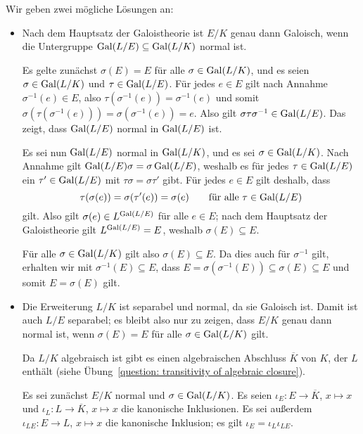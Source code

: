 \begin{solution}
  Wir geben zwei mögliche Lösungen an:
  \begin{itemize}
    \item
      Nach dem Hauptsatz der Galoistheorie ist $E/K$ genau dann Galoisch, wenn die Untergruppe $\operatorname{Gal}(L/E) \subseteq \operatorname{Gal}(L/K)$ normal ist.
      
      Es gelte zunächst $\sigma(E) = E$ für alle $\sigma \in \operatorname{Gal}(L/K)$, und es seien $\sigma \in \operatorname{Gal}(L/K)$ und $\tau \in \operatorname{Gal}(L/E)$.
      Für jedes $e \in E$ gilt nach Annahme $\sigma^{-1}(e) \in E$, also $\tau(\sigma^{-1}(e)) = \sigma^{-1}(e)$ und somit $\sigma(\tau(\sigma^{-1}(e))) = \sigma(\sigma^{-1}(e)) = e$.
      Also gilt $\sigma \tau \sigma^{-1} \in \operatorname{Gal}(L/E)$.
      Das zeigt, dass $\operatorname{Gal}(L/E)$ normal in $\operatorname{Gal}(L/E)$ ist.
      
      Es sei nun $\operatorname{Gal}(L/E)$ normal in $\operatorname{Gal}(L/K)$, und es sei $\sigma \in \operatorname{Gal}(L/K)$.
      Nach Annahme gilt $\operatorname{Gal}(L/E) \sigma = \sigma \operatorname{Gal}(L/E)$, weshalb es für jedes $\tau \in \operatorname{Gal}(L/E)$ ein $\tau' \in \operatorname{Gal}(L/E)$ mit $\tau \sigma = \sigma \tau'$ gibt.
      Für jedes $e \in E$ gilt deshalb, dass
      \[
        \tau(\sigma(e)) = \sigma(\tau'(e)) = \sigma(e)
        \qquad
        \text{für alle $\tau \in \operatorname{Gal}(L/E)$}
      \]
      gilt.
      Also gilt $\sigma(e) \in L^{\operatorname{Gal}(L/E)}$ für alle $e \in E$;
      nach dem Hauptsatz der Galoistheorie gilt $L^{\operatorname{Gal}(L/E)} = E$, weshalb $\sigma(E) \subseteq E$.
      
      Für alle $\sigma \in \operatorname{Gal}(L/K)$ gilt also $\sigma(E) \subseteq E$.
      Da dies auch für $\sigma^{-1}$ gilt, erhalten wir mit $\sigma^{-1}(E) \subseteq E$, dass $E = \sigma(\sigma^{-1}(E)) \subseteq \sigma(E) \subseteq E$ und somit $E = \sigma(E)$ gilt.
      
    \item
      Die Erweiterung $L/K$ ist separabel und normal, da sie Galoisch ist.
      Damit ist auch $L/E$ separabel;
      es bleibt also nur zu zeigen, dass $E/K$ genau dann normal ist, wenn $\sigma(E) = E$ für alle $\sigma \in \operatorname{Gal}(L/K)$ gilt.
      
      Da $L/K$ algebraisch ist gibt es einen algebraischen Abschluss $\overline{K}$ von $K$, der $L$ enthält (siehe Übung~\ref{question: transitivity of algebraic closure}).
      
      Es sei zunächst $E/K$ normal und $\sigma \in \operatorname{Gal}(L/K)$.
      Es seien $\iota_E \colon E \to \overline{K}$, $x \mapsto x$ und $\iota_L \colon L \to \overline{K}$, $x \mapsto x$ die kanonische Inklusionen.
      Es sei außerdem $\iota_{LE} \colon E \to L$, $x \mapsto x$ die kanonische Inklusion;
      es gilt $\iota_E = \iota_L \iota_{LE}$.
      

\end{itemize}
\end{solution}
